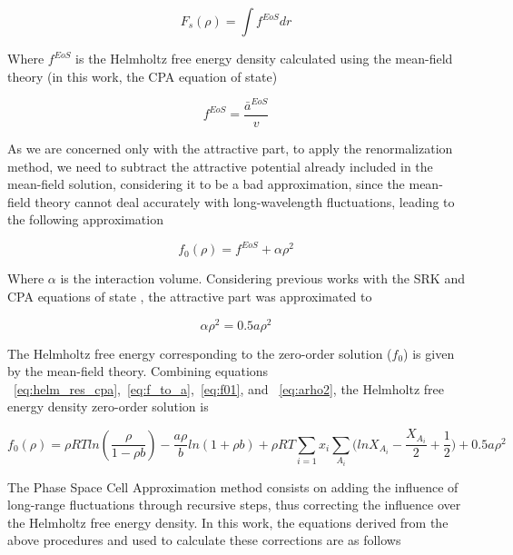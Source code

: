 \documentclass[preprint,12pt,3p]{elsarticle}
\begin{document}
\begin{equation} \label{eq:Fs}
    F_{s}(\rho) = \int f^{EoS} dr
\end{equation}

    Where $f^{EoS}$ is the Helmholtz free energy density calculated using the mean-field theory (in this work, the CPA equation of state)

\begin{equation} \label{eq:f_to_a}
    f^{EoS} = \frac{\bar{a}^{EoS}}{v}
\end{equation}
    
    As we are concerned only with the attractive part, to apply the renormalization method, we need to subtract the attractive potential already included in the mean-field solution, considering it to be a bad approximation, since the mean-field theory cannot deal accurately with long-wavelength fluctuations, leading to the following approximation
    
\begin{equation} \label{eq:f01}
    f_{0}(\rho) = f^{EoS} + \alpha\rho^2
\end{equation}
    
    Where $\alpha$ is the interaction volume. Considering previous works with the SRK and CPA equations of state \cite{cai2004thermodynamics,pcm2017application,xu2010crossover}, the attractive part was approximated to

\begin{equation} \label{eq:arho2}
    \alpha\rho^2 = 0.5a\rho^2
\end{equation}

    The Helmholtz free energy corresponding to the zero-order solution ($f_{0}$) is given by the mean-field theory. Combining equations ~\ref{eq:helm_res_cpa},~\ref{eq:f_to_a},~\ref{eq:f01}, and ~\ref{eq:arho2}, the Helmholtz free energy density zero-order solution is

\begin{equation} \label{eq:f00}
f_{0}(\rho) = \rho RTln(\frac{\rho}{1-\rho b})-\frac{a\rho}{b}ln(1+\rho b) + \rho RT\sum_{i=1} x_{i} \sum_{A_{i}}\Big(lnX_{A_{i}} - \frac{X_{A_{i}}}{2} + \frac{1}{2}\Big) + 0.5a\rho^2
\end{equation}  

	The Phase Space Cell Approximation method consists on adding the influence of long-range fluctuations through recursive steps, thus correcting the influence over the Helmholtz free energy density. In this work, the equations derived from the above procedures and used to calculate these corrections are as follows
	
\end{document}
